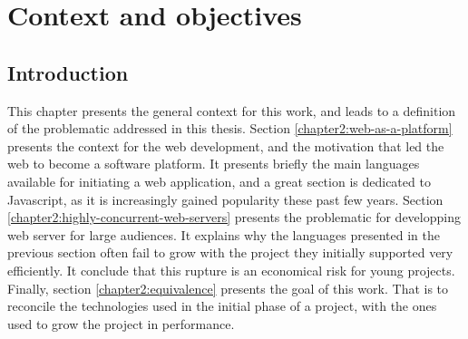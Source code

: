 \chapter{Context and objectives} \label{chapter2}
\minitoc
\eject

\section{Introduction}

This chapter presents the general context for this work, and leads to a definition of the problematic addressed in this thesis.
Section \ref{chapter2:web-as-a-platform} presents the context for the web development, and the motivation that led the web to become a software platform. It presents briefly the main languages available for initiating a web application, and a great section is dedicated to Javascript, as it is increasingly gained popularity these past few years.
Section \ref{chapter2:highly-concurrent-web-servers} presents the problematic for developping web server for large audiences.
It explains why the languages presented in the previous section often fail to grow with the project they initially supported very efficiently.
It conclude that this rupture is an economical risk for young projects.
Finally, section \ref{chapter2:equivalence} presents the goal of this work.
That is to reconcile the technologies used in the initial phase of a project, with the ones used to grow the project in performance.



